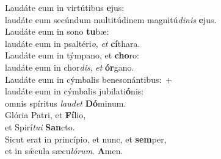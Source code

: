 \evenverse Laudáte eum in virtútibus \textbf{e}jus:~\*\\
\evenverse laudáte eum secúndum multitúdinem magnitú\textit{di}\textit{nis} \textbf{e}jus.\\
\oddverse Laudáte eum in sono \textbf{tu}bæ:~\*\\
\oddverse laudáte eum in psaltéri\textit{o}, \textit{et} \textbf{cí}thara.\\
\evenverse Laudáte eum in týmpano, et \textbf{cho}ro:~\*\\
\evenverse laudáte eum in chor\textit{dis}, \textit{et} \textbf{ór}gano.\\
\oddverse Laudáte eum in cýmbalis benesonántibus:~+\\
\oddverse  laudáte eum in cýmbalis jubilati\textbf{ó}nis:~\*\\
\oddverse omnis spíritus \textit{lau}\textit{det} \textbf{Dó}minum.\\
\evenverse Glória Patri, et \textbf{Fí}lio,~\*\\
\evenverse et Spirí\textit{tu}\textit{i} \textbf{San}cto.\\
\oddverse Sicut erat in princípio, et nunc, et \textbf{sem}per,~\*\\
\oddverse et in sǽcula sæcu\textit{ló}\textit{rum}. \textbf{A}men.\\
